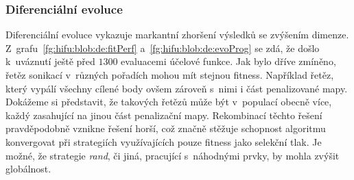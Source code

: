 \subsubsection{Diferenciální evoluce}
Diferenciální evoluce vykazuje markantní zhoršení výsledků se zvýšením dimenze. Z~grafu~\ref{fg:hifu:blob:de:fitPerf} a~\ref{fg:hifu:blob:de:evoProg} se zdá, že došlo k~uváznutí ještě před $1300$ evaluacemi účelové funkce. Jak bylo dříve zmíněno, řetěz sonikací v~různých pořadích mohou mít stejnou fitness. Například řetěz, který vypálí všechny cílené body ovšem zároveň s~nimi i část penalizované mapy. Dokážeme si představit, že takových řetězů může být v~populací obecně více, každý zasahující na jinou část penalizační mapy. Rekombinací těchto řešení pravděpodobně vznikne řešení horší, což značně stěžuje schopnost algoritmu konvergovat při strategiích využívajících pouze fitness jako selekční tlak. Je možné, že strategie \emph{rand}, či jiná, pracující s~náhodnými prvky, by mohla zvýšit globálnost.

